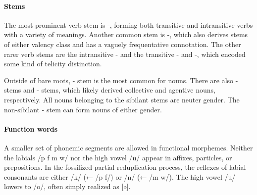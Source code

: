 \paragraph{Stems} The most prominent verb stem is -, forming both transitive and intransitive verbs with a variety of meanings. Another common stem is -, which also derives stems of either valency class and has a vaguely frequentative connotation. The other rarer verb stems are the intransitive - and the transitive - and -, which encoded some kind of telicity distinction.

Outside of bare roots, - stem is the most common for nouns. There are also - stems and - stems, which likely derived collective and agentive nouns, respectively. All nouns belonging to the sibilant stems are neuter gender. The non-sibilant - stem can form nouns of either gender.

\paragraph{Function words}
A smaller set of phonemic segments are allowed in functional morphemes. Neither the labials /p f m w/ nor the high vowel /u/ appear in affixes, particles, or prepositions. In the fossilized partial reduplication process, the reflexes of labial consonants are either /k/ (← /p f/) or /n/ (← /m w/). The high vowel /u/ lowers to /o/, often simply realized as [ə].